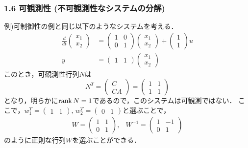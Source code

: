\begin{frame}[t]
\frametitle{1.6 可観測性 (不可観測性なシステムの分解)}
例)可制御性の例と同じ以下のようなシステムを考える．
\begin{align}
 \frac{d}{dt}
  \left(
   \begin{array}{c}
    x_1 \\
    x_2
   \end{array}
  \right) &=
  \left(
   \begin{array}{cc}
    1 & 0 \\
    0 & 1
   \end{array}
  \right)
  \left(
   \begin{array}{c}
    x_1 \\
    x_2
   \end{array}
  \right) +
  \left(
   \begin{array}{c}
    1 \\
    1
   \end{array}
  \right) u \\
 y &=
  \left(
   \begin{array}{cc}
    1 & 1
   \end{array}
  \right)
  \left(
   \begin{array}{c}
    x_1 \\
    x_2
   \end{array}
  \right)
\end{align}
このとき，可観測性行列$N$は
\begin{equation}
 N^T =
  \left(
   \begin{array}{c}
    C \\
    CA
   \end{array}
  \right) =
  \left(
   \begin{array}{cc}
    1 & 1 \\
    1 & 1
   \end{array}
  \right)
\end{equation}
となり，明らかに$\mathop{\rm rank}\nolimits N = 1$であるので，このシステムは可観測ではない．
ここで，$w_1^T = (\begin{array}{cc}1 & 1\end{array})$,
$w_2^T = (\begin{array}{cc}0 & 1\end{array})$と選ぶことで，
\begin{equation}
 \begin{array}{cc}
  W =
   \left(
    \begin{array}{cc}
     1 & 1 \\
     0 & 1
    \end{array}
   \right),
   &
  W^{-1} =
   \left(
    \begin{array}{cc}
     1 & -1 \\
     0 & 1
    \end{array}
   \right)
 \end{array}
\end{equation}
のように正則な行列$W$を選ぶことができる．
\end{frame}


